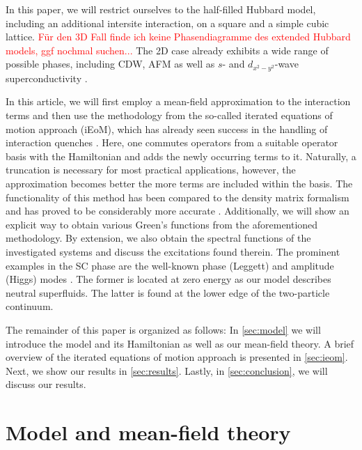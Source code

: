 \documentclass[
    reprint, 
    aps,
    preprintnumbers,
    twocolumn,
    prb,
    superscriptaddress
]{revtex4-2}
\begin{document}
In this paper, we will restrict ourselves to the half-filled Hubbard model, including an additional intersite interaction, on a square and a simple cubic lattice.
\textcolor{red}{Für den 3D Fall finde ich keine Phasendiagramme des extended Hubbard models, ggf nochmal suchen...}
The 2D case already exhibits a wide range of possible phases, including CDW, AFM as well as $s$- and $d_{x^2 - y^2}$-wave superconductivity
\cite{Micnas88b,Tsuchiura95,Su01,Su04,ha11,Huang13,Jiang22}.

In this article, we will first employ a mean-field approximation to the interaction terms 
and then use the methodology from the so-called iterated equations of motion approach (iEoM),
which has already seen success in the handling of interaction quenches \cite{uhrig09,hamerla13,hamerla14,bleicker18}.
Here, one commutes operators from a suitable operator basis with the Hamiltonian and adds the newly occurring terms to it.
Naturally, a truncation is necessary for most practical applications, however, the approximation becomes better the more terms are included within the basis.
The functionality of this method has been compared to the density matrix formalism and has proved to be considerably more accurate \cite{Kalthoff17}.
Additionally, we will show an explicit way to obtain various Green's functions from the aforementioned methodology.
By extension, we also obtain the spectral functions of the investigated systems and discuss the excitations found therein.
The prominent examples in the SC phase are the well-known phase (Leggett) and amplitude (Higgs) modes \cite{Varma02,Cea14,Measson14,Tsuji15,Krull16,Schwarz20,Fan22}.
The former is located at zero energy as our model describes neutral superfluids.
The latter is found at the lower edge of the two-particle continuum.

The remainder of this paper is organized as follows:
In \autoref{sec:model} we will introduce the model and its Hamiltonian as well as our mean-field theory.
A brief overview of the iterated equations of motion approach is presented in \autoref{sec:ieom}.
Next, we show our results in \autoref{sec:results}.
Lastly, in \autoref{sec:conclusion}, we will discuss our results.

\section{Model and mean-field theory}\label{sec:model}
\end{document}

